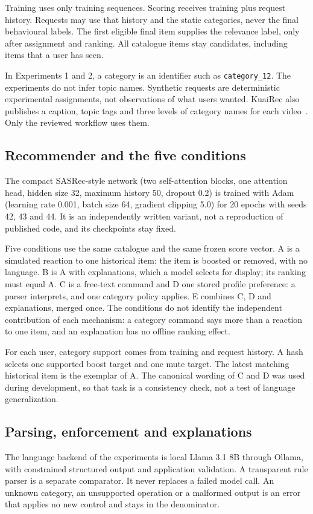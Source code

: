 \documentclass[conference]{IEEEtran}
\begin{document}
Training uses only training sequences. Scoring receives training plus request history. Requests may use that history and the static categories, never the final behavioural labels. The first eligible final item supplies the relevance label, only after assignment and ranking. All catalogue items stay candidates, including items that a user has seen.

In Experiments 1 and 2, a category is an identifier such as \texttt{category\_12}. The experiments do not infer topic names. Synthetic requests are deterministic experimental assignments, not observations of what users wanted. KuaiRec also publishes a caption, topic tags and three levels of category names for each video~\cite{kuairecdocs}. Only the reviewed workflow uses them.

\subsection{Recommender and the five conditions}
The compact SASRec-style network (two self-attention blocks, one attention head, hidden size 32, maximum history 50, dropout 0.2) is trained with Adam (learning rate 0.001, batch size 64, gradient clipping 5.0) for 20 epochs with seeds 42, 43 and 44. It is an independently written variant, not a reproduction of published code, and its checkpoints stay fixed.

Five conditions use the same catalogue and the same frozen score vector. A is a simulated reaction to one historical item: the item is boosted or removed, with no language. B is A with explanations, which a model selects for display; its ranking must equal A. C is a free-text command and D one stored profile preference: a parser interprets, and one category policy applies. E combines C, D and explanations, merged once. The conditions do not identify the independent contribution of each mechanism: a category command says more than a reaction to one item, and an explanation has no offline ranking effect.

For each user, category support comes from training and request history. A hash selects one supported boost target and one mute target. The latest matching historical item is the exemplar of A. The canonical wording of C and D was used during development, so that task is a consistency check, not a test of language generalization.

\subsection{Parsing, enforcement and explanations}
The language backend of the experiments is local Llama 3.1 8B through Ollama, with constrained structured output and application validation. A transparent rule parser is a separate comparator. It never replaces a failed model call. An unknown category, an unsupported operation or a malformed output is an error that applies no new control and stays in the denominator.
\end{document}
